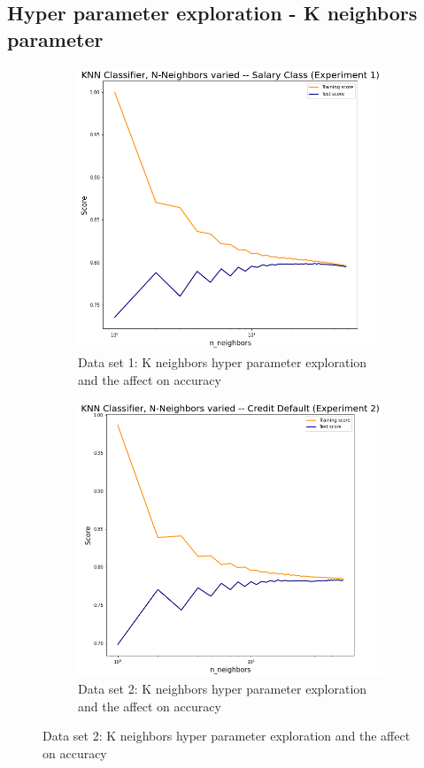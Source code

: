 \documentclass[
	letterpaper, %
]{IEEEtran}
\begin{document}
		\subsection{Hyper parameter exploration - K neighbors parameter}
			\begin{figure}[h]
				\begin{subfigure}{.5\textwidth}
					\centering
					\includegraphics[width=.8\linewidth]{./images/knnNeghbors1.png}
					\caption{Data set 1: K neighbors hyper parameter exploration and the affect on accuracy}
					\label{fig:knnNeighbors1}
				\end{subfigure}
				\begin{subfigure}{.5\textwidth}
					\centering
					\includegraphics[width=.8\linewidth]{./images/knnNeghbors2.png}
					\caption{Data set 2: K neighbors hyper parameter exploration and the affect on accuracy}
					\label{fig:knnNeighbors2}
				\end{subfigure}
			\end{figure}
\end{document}
